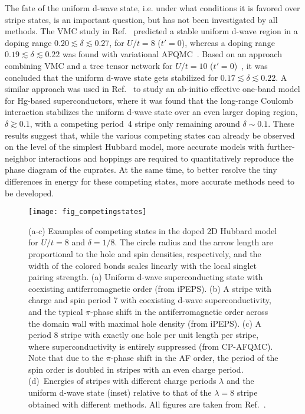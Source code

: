 \documentclass{ar-1col}
\begin{document}
The fate of the uniform d-wave state, i.e. under what conditions it is favored over stripe states, is an important question, but has not been investigated by all methods. The VMC study in Ref.~\cite{Tocchio19} predicted a stable uniform d-wave region in a doping range $0.20 \lesssim \delta  \lesssim 0.27$, for $U/t=8$ ($t'=0$), whereas a doping range $0.19 \lesssim \delta  \lesssim 0.22$ was found with variational AFQMC~\cite{Sorella21}.  Based on an approach combining VMC and a tree tensor network for $U/t=10$ ($t'=0$)~\cite{Darmawan18}, it was concluded that the uniform d-wave state gets stabilized for $0.17 \lesssim \delta  \lesssim 0.22$. 
%
A similar approach was used in Ref.~\cite{Ohgoe20} to study an ab-initio effective one-band model for Hg-based superconductors, where it was found that the long-range Coulomb interaction stabilizes the uniform d-wave state over an even larger doping region, $\delta \gtrsim 0.1$, with a competing period~4 stripe only remaining around  $\delta \sim 0.1$. These results suggest that, while the various competing states can already be observed on the level of the simplest Hubbard model, more accurate models with further-neighbor interactions and hoppings are required  to quantitatively reproduce the phase diagram of the cuprates. At the same time, to better resolve the tiny differences in energy for these competing states, more accurate methods need to be developed.

\begin{figure}[]
  \centering
 \texttt{[image: fig\_competingstates]}
  \caption{(a-c) Examples of competing states in the doped 2D Hubbard model for $U/t=8$ and $\delta=1/8$. The circle radius and the arrow length are proportional to the hole and spin densities, respectively, and the width of the colored bonds scales linearly with the local singlet pairing strength. (a) Uniform d-wave superconducting state with coexisting antiferromagnetic order (from iPEPS). (b) A stripe with charge and spin period 7 with coexisting d-wave superconductivity, and the typical $\pi$-phase shift in the antiferromagnetic order across the domain wall with maximal hole density (from iPEPS). (c) A period 8 stripe with exactly one hole per unit length per stripe, where superconductivity is entirely suppressed (from CP-AFQMC). Note that due to the $\pi$-phase shift in the AF order, the period of the spin order is doubled in stripes with an even charge period. (d)~Energies of stripes with different charge periods $\lambda$ and the uniform d-wave state (inset) relative to that of the $\lambda=8$ stripe obtained with different methods. All figures are taken from Ref.~\cite{Zheng17}.  
  }
  \label{fig:competingstates}
\end{figure}
\end{document}
